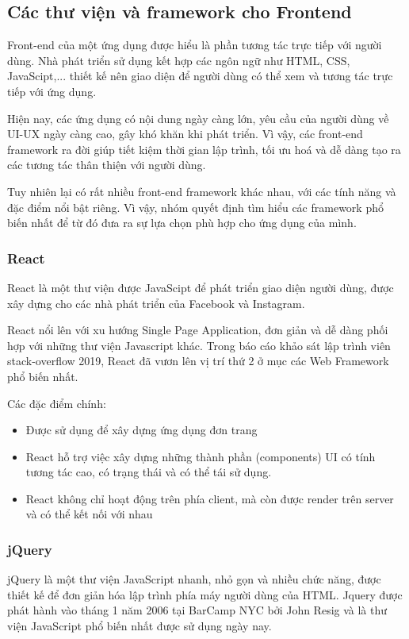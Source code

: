 \subsection{Các thư viện và framework cho Frontend}
Front-end của một ứng dụng được hiểu là phần tương tác trực tiếp với người dùng. Nhà phát triển sử dụng kết hợp các ngôn ngữ như HTML, CSS, JavaScipt,... thiết kế nên giao diện để người dùng có thể xem và tương tác trực tiếp với ứng dụng.

Hiện nay, các ứng dụng có nội dung ngày càng lớn, yêu cầu của người dùng về UI-UX ngày càng cao, gây khó khăn khi phát triển. Vì vậy, các front-end framework ra đời giúp tiết kiệm thời gian lập trình, tối ưu hoá và dễ dàng tạo ra các tương tác thân thiện với người dùng.

Tuy nhiên lại có rất nhiều front-end framework khác nhau, với các tính năng và đặc điểm nổi bật riêng. Vì vậy, nhóm quyết định tìm hiểu các framework phổ biến nhất để từ đó đưa ra sự lựa chọn phù hợp cho ứng dụng của mình.
\subsubsection{React}
React là một thư viện được JavaScipt để phát triển giao diện người dùng, được xây dựng cho các nhà phát triển của Facebook và Instagram.

React nổi lên với xu hướng Single Page Application, đơn giản và dễ dàng phối hợp với những thư viện Javascript khác. Trong báo cáo khảo sát lập trình viên stack-overflow 2019, React đã vươn lên vị trí thứ 2 ở mục các Web Framework phổ biến nhất.

Các đặc điểm chính:
\begin {itemize}
\item Được sử dụng để xây dựng ứng dụng đơn trang
\item React hỗ trợ việc xây dựng những thành phần (components) UI có tính tương tác cao, có trạng thái và có thể tái sử dụng.
\item React không chỉ hoạt động trên phía client, mà còn được render trên server và có thể kết nối với nhau
\end {itemize}

\subsubsection{jQuery}
jQuery là một thư viện JavaScript nhanh, nhỏ gọn và nhiều chức năng, được thiết kế để đơn giản hóa lập trình phía máy người dùng của HTML. Jquery được phát hành vào tháng 1 năm 2006 tại BarCamp NYC bởi John Resig và là thư viện JavaScript phổ biến nhất được sử dụng ngày nay.

